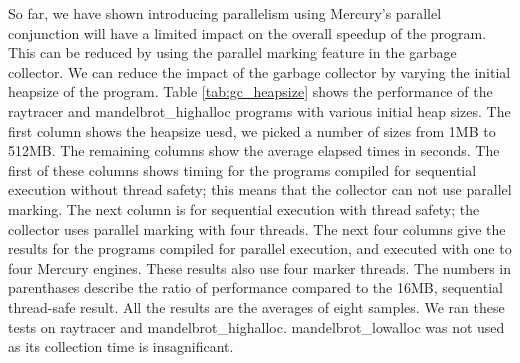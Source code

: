 


So far,
we have shown introducing parallelism using Mercury's parallel conjunction
will have a limited impact on the overall speedup of the program.
This can be reduced by using the parallel marking feature in the garbage
collector.
We can reduce the impact of the garbage collector by varying the initial
heapsize of the program.
Table \ref{tab:gc_heapsize} shows the performance of the raytracer and
mandelbrot\_highalloc programs with various initial heap sizes.
The first column shows the heapsize uesd,
we picked a number of sizes from 1MB to 512MB.
The remaining columns show the average elapsed times in seconds.
The first of these columns shows timing for the programs compiled for
sequential execution without thread safety;
this means that the collector can not use parallel marking.
The next column is for sequential execution with thread safety;
the collector uses parallel marking with four threads.
The next four columns give the results for the programs compiled for
parallel execution, and executed with one to four Mercury engines.
These results also use four marker threads.
The numbers in parenthases describe the ratio of performance compared to the
16MB, sequential thread-safe result.
All the results are the averages of eight samples.
We ran these tests on raytracer and mandelbrot\_highalloc.
mandelbrot\_lowalloc was not used as its collection time is insagnificant.

